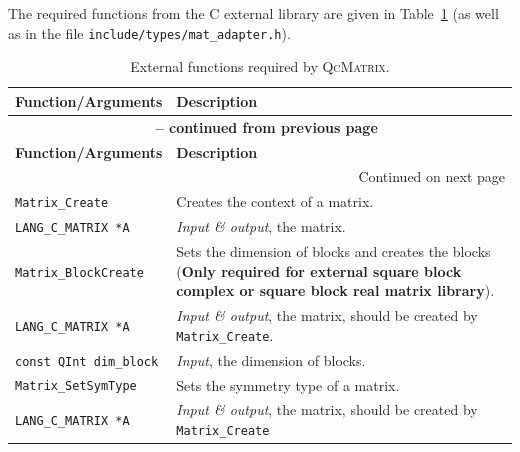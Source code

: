 \documentclass[a4paper,11pt,twoside,openright]{book}
\begin{document}
The required functions from the C external library are given in Table~\ref{tab-external-fun-C}
(as well as in the file \verb|include/types/mat_adapter.h|).
\begin{center}
  \small
  \begin{longtable}{l|p{}}
    \caption{External functions required by \textsc{QcMatrix}.}
    \label{tab-external-fun-C}\\
    \hline\hline
    \textbf{Function/Arguments} & \textbf{Description}\\
    \hline
    \endfirsthead
    \multicolumn{2}{c}{{\bfseries \tablename\ \thetable{} -- continued from previous page}}\\
    \hline\hline
    \textbf{Function/Arguments} & \textbf{Description}\\
    \hline
    \endhead
    \hline
    \multicolumn{2}{r}{Continued on next page}\\
    \hline
    \endfoot
    \hline\hline
    \endlastfoot
%
    \verb|Matrix_Create|\index{\texttt{Matrix\_Create}} %
      & Creates the context of a matrix.\\
    \hspace*{2ex}\verb|LANG_C_MATRIX *A| %
      & \textsl{Input \& output}, the matrix.\\
    \hline
%
    \verb|Matrix_BlockCreate|\index{\texttt{Matrix\_BlockCreate}} %
      & Sets the dimension of blocks and creates the blocks %
        (\textbf{Only required for external square block complex or
        square block real matrix library}).\\
    \hspace*{2ex}\verb|LANG_C_MATRIX *A| %
      & \textsl{Input \& output}, the matrix, should be created by \verb|Matrix_Create|.\\
    \hspace*{2ex}\verb|const QInt dim_block| %
      & \textsl{Input}, the dimension of blocks.\\
    \hline
%
    \verb|Matrix_SetSymType|\index{\texttt{Matrix\_SetSymType}} %
      & Sets the symmetry type of a matrix.\\
    \hspace*{2ex}\verb|LANG_C_MATRIX *A| %
      & \textsl{Input \& output}, the matrix, should be created by \verb|Matrix_Create|

\end{longtable}
\end{center}
\end{document}
